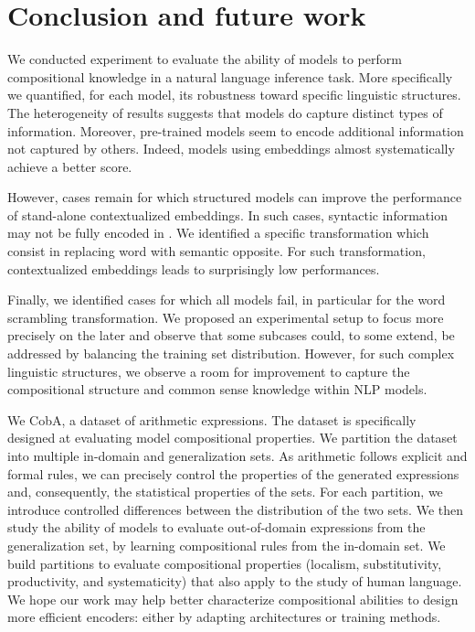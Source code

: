 \section{Conclusion and future work}

We conducted experiment to evaluate the ability of models to perform compositional knowledge in a natural language inference task. More specifically we quantified, for each model, its robustness toward specific linguistic structures. The heterogeneity of results suggests that models do capture distinct types of information. Moreover, pre-trained \bert models seem to encode additional information not captured by others. Indeed, models using \bert embeddings almost systematically achieve a better score. 

However, cases remain for which structured models can improve the performance of stand-alone contextualized embeddings. In such cases, syntactic information may not be fully encoded in \bert. We identified a specific transformation which consist in replacing word with semantic opposite. For such transformation, \bert contextualized embeddings leads to surprisingly low performances.

Finally, we identified cases for which all models fail, in particular for the word scrambling transformation. We proposed an experimental setup to focus more precisely on the later and observe that some subcases could, to some extend, be addressed by balancing the training set distribution. However, for such complex linguistic structures, we observe a room for improvement to capture the compositional structure and common sense knowledge within NLP models.

We  CobA, a dataset  of arithmetic expressions. The dataset is specifically designed at evaluating model compositional properties. We partition the dataset into multiple in-domain and generalization sets. As arithmetic follows explicit and formal rules, we can precisely control the properties of the generated expressions and, consequently, the statistical properties of the sets. For each partition, we introduce controlled differences between the distribution of the two sets. We then study the ability of models to evaluate out-of-domain expressions from the generalization set, by learning compositional rules from the in-domain set. We build partitions to evaluate compositional properties (localism, substitutivity, productivity, and systematicity) that also apply to the study of human language. We hope our work may help better characterize compositional abilities to design more efficient encoders: either by adapting architectures or training methods.

